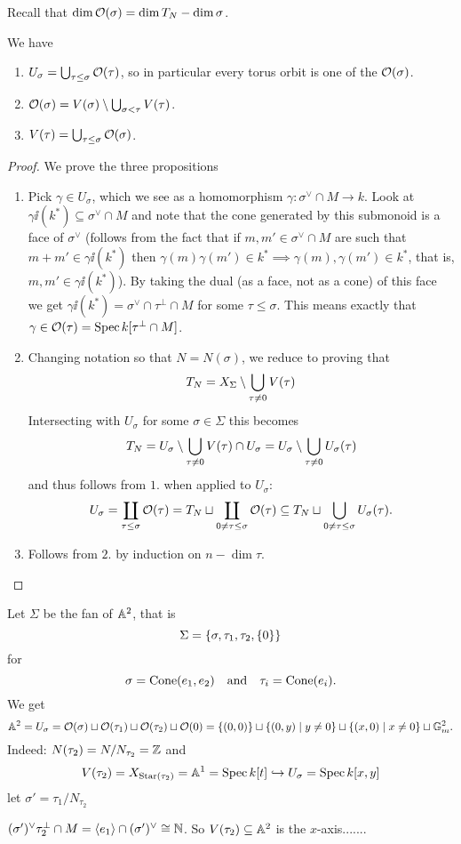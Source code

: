 Recall that $\dim \mathcal{O}(\sigma)=\dim T_N-\dim \sigma$.

\begin{proposition}[]\label{PrOrbit-ConeCorrespondence}
We have
\begin{enumerate}
\item $U_\sigma=\bigcup_{\tau\leq \sigma}\mathcal{O}(\tau)$, so in particular every torus orbit is one of the $\mathcal{O}(\sigma)$.
\item $\mathcal{O}(\sigma)=V(\sigma)\setminus \bigcup_{\sigma<\tau}V(\tau)$.
\item $V(\tau)=\bigcup_{\tau\leq \sigma}\mathcal{O}(\sigma)$.
\end{enumerate}
\end{proposition}
\begin{proof}
We prove the three propositions
\setlength{\leftmargini}{0cm}
\begin{enumerate}
\item Pick $\gamma\in U_\sigma$, which we see as a homomorphism $\gamma:\sigma^\vee\cap M\to k$. Look at $\gamma\ii(k^\ast)\subseteq \sigma^\vee\cap M$ and note that the cone generated by this submonoid is a face of $\sigma^\vee$ (follows from the fact that if $m,m'\in \sigma^\vee\cap M$ are such that $m+m'\in \gamma\ii(k^\ast)$ then $\gamma(m)\gamma(m')\in k^\ast\implies \gamma(m),\gamma(m')\in k^\ast$, that is, $m,m'\in \gamma\ii(k^\ast)$). By taking the dual (as a face, not as a cone) of this face we get $\gamma\ii(k^\ast)=\sigma^\vee\cap \tau^\perp\cap M$ for some $\tau\leq \sigma$. This means exactly that $\gamma\in \mathcal{O}(\tau)=\operatorname{Spec} k[\tau^\perp\cap M]$.
\item Changing notation so that $N=N(\sigma)$, we reduce to proving that
\[T_N=X_\Sigma\setminus \bigcup_{\tau\neq 0}V(\tau)\]
Intersecting with $U_\sigma$ for some $\sigma\in \Sigma$ this becomes
\[T_N=U_\sigma\setminus \bigcup_{\tau\neq 0}V(\tau)\cap U_\sigma=U_\sigma\setminus \bigcup_{\tau\neq 0}U_\sigma(\tau)\]
and thus follows from $1.$ when applied to $U_\sigma$:
\[U_\sigma=\coprod_{\tau\leq \sigma}\mathcal{O}(\tau)=T_N\sqcup\coprod_{0\neq \tau\leq \sigma}\mathcal{O}(\tau)\subseteq T_N\sqcup\bigcup_{0\neq \tau\leq \sigma}U_\sigma(\tau).\]
\item Follows from $2.$ by induction on $n-\dim\tau$.
\end{enumerate}
\setlength{\leftmargini}{0.5cm}
\end{proof}



\begin{example}
Let $\Sigma$ be the fan of $\mathbb{A}^2$, that is
\[\Sigma=\left\{{\sigma,\tau_1,\tau_2, \left\{{0}\right\}}\right\}\]
for
\[\sigma=\operatorname{Cone}(e_1,e_2)\quad\text{and}\quad \tau_i=\operatorname{Cone}(e_i).\]
We get
\[\mathbb{A}^2=U_\sigma=\mathcal{O}(\sigma)\sqcup\mathcal{O}(\tau_1)\sqcup\mathcal{O}(\tau_2)\sqcup\mathcal{O}(0)=\left\{{(0,0)}\right\}\sqcup \left\{{(0,y)\mid y\neq 0}\right\}\sqcup \left\{{(x,0)\mid x\neq 0}\right\}\sqcup \mathbb{G}_m^2.\]
Indeed: $N(\tau_2)=N/N_{\tau_2}=\mathbb{Z}$ and
\[V(\tau_2)=X_{\operatorname{Star}(\tau_2)}=\mathbb{A}^1=\operatorname{Spec} k[t]\hookrightarrow U_\sigma=\operatorname{Spec} k[x,y]\]
let $\sigma'=\tau_1/N_{\tau_2}$

$(\sigma')^\vee\tau_2^\perp \cap M=\left\langle {e_1}\right\rangle\cap (\sigma')^\vee\cong \mathbb{N}$. So $V(\tau_2)\subseteq \mathbb{A}^2$ is the $x$-axis.......
\end{example}



